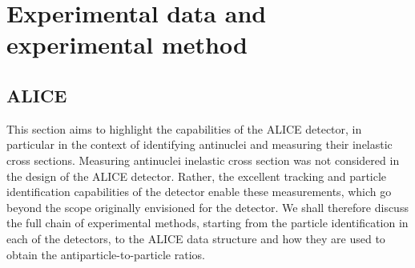 \section{Experimental data and experimental method}\label{sec:ExperimentAndMethod}

\subsection{ALICE}
This section aims to highlight the capabilities of the ALICE detector, in particular in the context of identifying antinuclei and measuring their inelastic cross sections. Measuring antinuclei inelastic cross section was not considered in the design of the ALICE detector. Rather, the excellent tracking and particle identification capabilities of the detector enable these measurements, which go beyond the scope originally envisioned for the detector. We shall therefore discuss the full chain of experimental methods, starting from the particle identification in each of the detectors, to the ALICE data structure and how they are used to obtain the antiparticle-to-particle ratios. 

